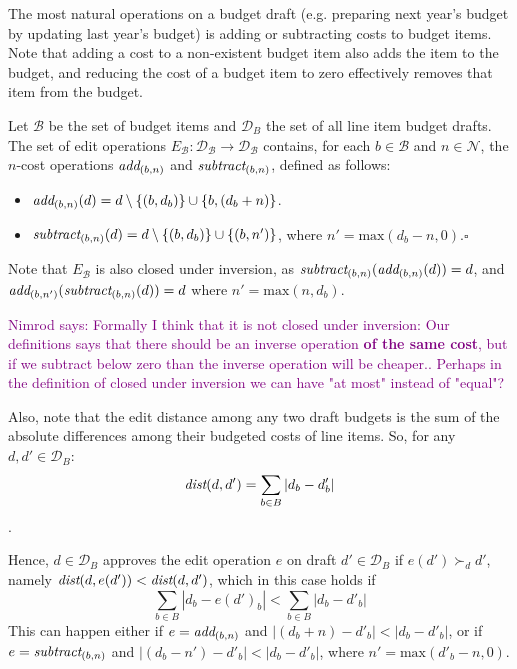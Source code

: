 \documentclass[sigconf]{aamas}  %
\newcommand{\nimrod}[1]{\textcolor{purple}{Nimrod says: #1}}
\newcommand{\qqed}{\hfill$\square$}
\newcommand{\calD}{\mathcal{D}}
\newcommand{\add}[1]{\emph{add}_{#1}}
\newcommand{\subtract}[1]{\emph{subtract}_{#1}}
\newcommand{\prefers}[1]{\succ_{#1}}
\newcommand{\dist}{\emph{dist}}
\newcommand{\calB}{\mathcal{B}}
\newcommand{\calN}{\mathcal{N}}
\begin{document}
The most natural operations on a budget draft (e.g. preparing next year's budget by updating last year's budget) is adding or subtracting costs to budget items. Note that adding a cost to a non-existent budget item also adds the item to the budget, and reducing the cost of a  budget item to zero effectively removes that item from the budget.

\begin{definition}
Let $\calB$ be the set of budget items and $\calD_B$ the set of all line item budget drafts. The set of edit operations $E_\calB: \calD_\calB \rightarrow \calD_\calB$ contains, for each $b \in \calB$ and $n \in \calN$, the $n$-cost operations $\add{(b,n)}$ and $\subtract{(b,n)}$, defined as follows: 
\begin{itemize}
    \item $\add{(b,n)}(d) = d \setminus \{(b,d_b)\} \cup \{b,(d_b+n)\}$.
    \item $\subtract{(b,n)}(d) = d \setminus \{(b,d_b)\} \cup \{(b,n')\}$, where $n' = \textrm{max}(d_b-n,0)$.\qqed
\end{itemize}
\end{definition}

Note that $E_\calB$ is also closed under inversion, as $\subtract{(b,n)}(\add{(b,n)}(d)) = d$, and $\add{(b,n')}(\subtract{(b,n)}(d)) = d$ where $n' = \textrm{max}(n,d_b)$.

\nimrod{Formally I think that it is not closed under inversion: Our definitions says that there should be an inverse operation \textbf{of the same cost}, but if we subtract below zero than the inverse operation will be cheaper.. Perhaps in the definition of closed under inversion we can have "at most" instead of "equal"?}

Also, note that the edit distance among any two draft budgets  is the sum of the absolute differences among their budgeted costs of line items.  So, for any  $d, d' \in \calD_B$:
$$
\dist(d,d') = \sum_{b \in B} |d_b - d'_b|  
$$.

Hence,
$d \in \calD_B$ approves the edit operation $e$ on draft $d' \in \calD_B$ if $e(d') \prefers{d} d'$, namely  $\dist(d, e(d')) < \dist(d, d')$, which in this case holds if
$$
\sum_{b \in B} |d_b - e(d')_b| <
\sum_{b \in B} |d_b - d'_b|
$$
 This can happen either if $e = \add{(b,n)}$ and 
 $|(d_b + n) - d'_b| < |d_b - d'_b|$, 
 or if 
 $e = \subtract{(b,n)}$   and
 $|(d_b - n') - d'_b| < |d_b - d'_b| $, 
 where $n' = \textrm{max}(d'_b - n, 0)$.
\end{document}
